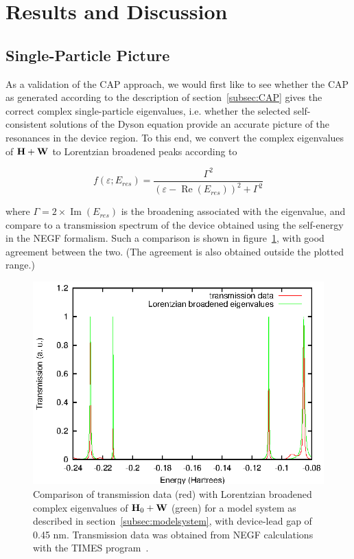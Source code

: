 \section{Results and Discussion}
\label{sec:results}

\subsection{Single-Particle Picture}
\label{subsec:SingleParticle}

As a validation of the \ac{CAP} approach, we would first like to see whether
the \ac{CAP} as generated according to the description of
section~\ref{subsec:CAP} gives the correct complex single-particle eigenvalues,
i.e. whether the selected self-consistent solutions of the Dyson equation
provide an accurate picture of the resonances in the device region. To this
end, we convert the complex eigenvalues of $\mathbf{H} + \mathbf{W}$ to Lorentzian
broadened peaks according to

\begin{equation}
	f(\varepsilon;E_{res})
	= \frac{\Gamma^2}{(\varepsilon - \operatorname{Re}(E_{res}))^2 + \Gamma^2}
	\label{eq:lobro}
\end{equation}

where $\Gamma = 2 \times \operatorname{Im}(E_{res})$ is the broadening
associated with the eigenvalue, and compare to a transmission spectrum of the
device obtained using the self-energy in the \ac{NEGF} formalism. Such a
comparison is shown in figure~\ref{fig:lobro-hwevals}, with good agreement
between the two. (The agreement is also obtained outside the plotted range.)

\begin{figure}
	\begin{center}
		\includegraphics[width=0.9\linewidth]{figures/4evals}
	\end{center}
	\caption{Comparison of transmission data (red) with Lorentzian
	broadened complex eigenvalues of $\mathbf{H}_0 + \mathbf{W}$ (green) for a
	model system as described in section~\ref{subsec:modelsystem}, with
	device-lead gap of 0.45 nm. Transmission data was obtained from
	\ac{NEGF} calculations with the TIMES program~\cite{times}.}
	\label{fig:lobro-hwevals}
\end{figure}

